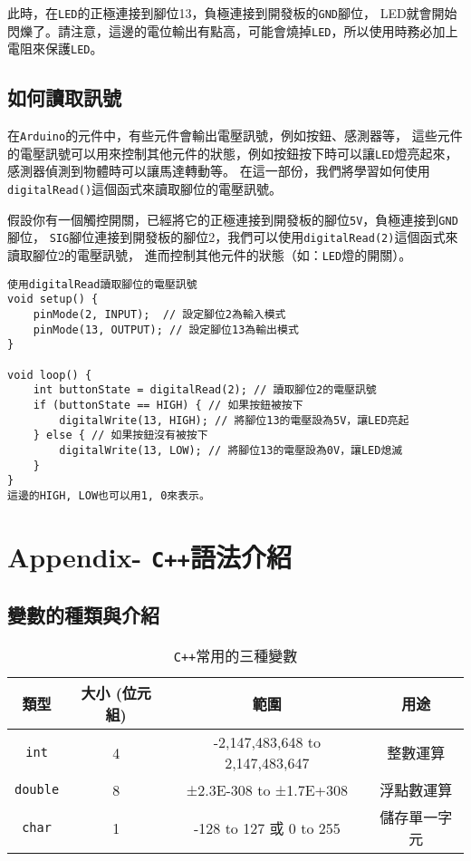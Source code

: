 \documentclass[12pt,a4paper]{article}
\begin{document}
此時，在\texttt{LED}的正極連接到腳位13，負極連接到開發板的\texttt{GND}腳位，
LED就會開始閃爍了。請注意，這邊的電位輸出有點高，可能會燒掉\texttt{LED}，所以使用時務必加上電阻來保護\texttt{LED}。

\subsection{如何讀取訊號}
在\texttt{Arduino}的元件中，有些元件會輸出電壓訊號，例如按鈕、感測器等，
這些元件的電壓訊號可以用來控制其他元件的狀態，例如按鈕按下時可以讓\texttt{LED}燈亮起來，感測器偵測到物體時可以讓馬達轉動等。
在這一部份，我們將學習如何使用\texttt{digitalRead()}這個函式來讀取腳位的電壓訊號。

假設你有一個觸控開關，已經將它的正極連接到開發板的腳位\texttt{5V}，負極連接到\texttt{GND}腳位，
\texttt{SIG}腳位連接到開發板的腳位2，我們可以使用\texttt{digitalRead(2)}這個函式來讀取腳位2的電壓訊號，
進而控制其他元件的狀態（如：\texttt{LED}燈的開關）。

\begin{lstlisting}
使用digitalRead讀取腳位的電壓訊號
void setup() {
    pinMode(2, INPUT);  // 設定腳位2為輸入模式
    pinMode(13, OUTPUT); // 設定腳位13為輸出模式
}

void loop() {
    int buttonState = digitalRead(2); // 讀取腳位2的電壓訊號
    if (buttonState == HIGH) { // 如果按鈕被按下
        digitalWrite(13, HIGH); // 將腳位13的電壓設為5V，讓LED亮起
    } else { // 如果按鈕沒有被按下
        digitalWrite(13, LOW); // 將腳位13的電壓設為0V，讓LED熄滅
    }
}
這邊的HIGH, LOW也可以用1, 0來表示。
\end{lstlisting}

\newpage

\section{Appendix- \texttt{C++}語法介紹}


\subsection{變數的種類與介紹}

\begin{table}[h!]
\centering
\begin{tabular}{|c||c|c|c|}
\hline
\textbf{類型} & \textbf{大小 (位元組)} & \textbf{範圍} & \textbf{用途} \\ \hline
\texttt{int} & 4 & -2,147,483,648 to 2,147,483,647 & 整數運算 \\ \hline
\texttt{double} & 8 & ±2.3E-308 to ±1.7E+308 & 浮點數運算 \\ \hline
\texttt{char} & 1 & -128 to 127 或 0 to 255 & 儲存單一字元 \\ \hline
\end{tabular}
\caption{\texttt{C++}常用的三種變數}
\label{tab:datatype_comparison}
\end{table}
\end{document}
